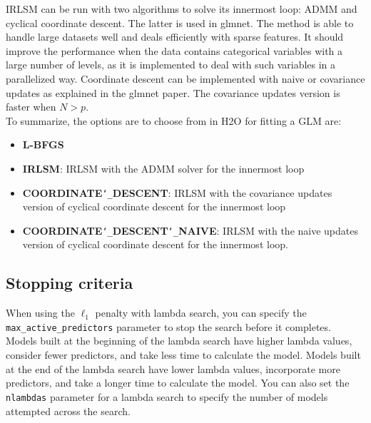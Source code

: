 
IRLSM can be run with two algorithms to solve its innermost loop: ADMM and cyclical coordinate descent. The latter is used in glmnet. The method is able to handle large datasets well and deals efficiently with sparse features. It should improve the performance when the data contains categorical variables with a large number of levels, as it is implemented to deal with such variables in a parallelized way. Coordinate descent can be implemented with naive or covariance updates as explained in the glmnet paper. The covariance updates version is faster when $N>p$. \\

To summarize, the options are to choose from in H2O for fitting a GLM are:
\begin{itemize}
 \item \textbf{L-BFGS}
 \item \textbf{IRLSM}: IRLSM with the ADMM solver for the innermost loop
 \item \textbf{COORDINATE}\texttt{\char`_}\textbf{DESCENT}: IRLSM with the covariance updates version of cyclical coordinate descent for the innermost loop
 \item \textbf{COORDINATE}\texttt{\char`_}\textbf{DESCENT}\texttt{\char`_}\textbf{NAIVE}: IRLSM with the naive updates version of cyclical coordinate descent for the innermost loop.
\end{itemize}


\subsection{Stopping criteria}

When using the $\ell_1$ penalty with lambda search, you can specify the \texttt{max\_active\_predictors} parameter to stop
the search before it completes.  Models built at the beginning of the lambda search have higher lambda values, consider fewer predictors, and take less time to calculate the model.  Models built at the end of the lambda search have
lower lambda values, incorporate more predictors, and take a longer time to calculate the model. You can also set the \texttt{nlambdas} parameter for a lambda search to specify the number of models attempted across the search.

